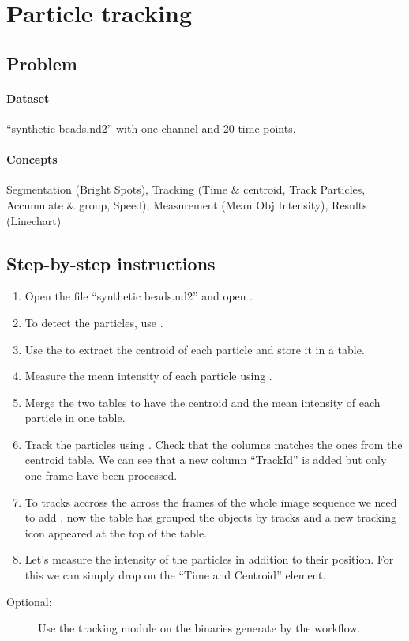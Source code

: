 \section{Particle tracking}

\subsection*{Problem}

\paragraph{Dataset} ``synthetic beads.nd2'' with one channel and 20 time points.

\paragraph{Concepts} Segmentation (Bright Spots), Tracking (Time \& centroid, Track Particles, Accumulate \& group, Speed), Measurement (Mean Obj Intensity), Results (Linechart)

\subsection*{Step-by-step instructions}

\begin{enumerate}
    \item Open the file ``synthetic beads.nd2'' and open .
    \item To detect the particles, use . 
    \item Use the  to extract the centroid of each particle and store it in a table.
    \item Measure the mean intensity of each particle using .
    \item Merge the two tables to have the centroid and the mean intensity of each particle in one table. 
    \item Track the particles using . Check that the columns matches the ones from the centroid table. We can see that a new column ``TrackId'' is added but only one frame have been processed.
    \item To tracks accross the across the frames of the whole image sequence we need to add , now the table has grouped the objects by tracks and a new tracking icon appeared at the top of the table.   
    \item Let's measure the intensity of the particles in addition to their position. For this we can simply drop  on the ``Time and Centroid'' element.
\end{enumerate}

\begin{description}
    \item[Optional:] Use the tracking module on the binaries generate by the workflow.
\end{description}
